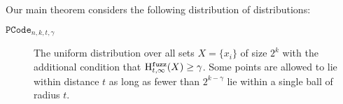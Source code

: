 
\label{sec:family}
Our main theorem considers the following distribution of distributions:

\begin{description}
    
    \item[$\mathtt{PCode}_{n, k, t, \gamma}$] The uniform distribution over all sets $X = \{x_i\}$ of size $2^k$ with the additional condition that $\mathrm{H}^{\mathtt{fuzz}}_{t,\infty}(X) \ge \gamma$.  Some points are allowed to lie within distance $t$ as long as fewer than $2^{k-\gamma}$ lie within a single ball of radius $t$.
\end{description}

